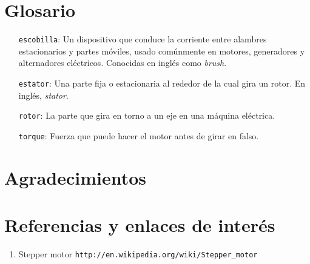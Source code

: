 \documentclass[final,narroweqnarray,inline,twoside]{ieee}
\begin{document}
\section{Glosario}
\begin{enumerate}
 \item[\texttt{escobilla}:] Un dispositivo que conduce la corriente entre alambres estacionarios y partes móviles, usado
comúnmente en motores, generadores y alternadores eléctricos. Conocidas en inglés como \textit{brush}.
 \item[\texttt{estator}:] Una parte fija o estacionaria al rededor de la cual gira un rotor. En inglés, \textit{stator}.
 \item[\texttt{rotor}:] La parte que gira en torno a un eje en una máquina eléctrica.
 \item[\texttt{torque}:] Fuerza que puede hacer el motor antes de girar en falso.
\end{enumerate}

\section{Agradecimientos}

\section{Referencias y enlaces de interés}
\begin{enumerate}
\item Stepper motor\newline
\margin \texttt{http://en.wikipedia.org/wiki/Stepper\_motor}\\
\end{enumerate}
\end{document}
